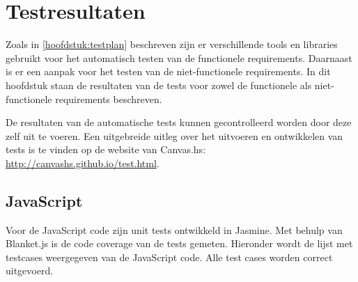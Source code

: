 \section{Testresultaten} \label{sec:testresultaten}
Zoals in \autoref{hoofdstuk:testplan} beschreven zijn er verschillende tools en libraries gebruikt voor het automatisch testen van de functionele requirements. Daarnaast is er een aanpak voor het testen van de niet-functionele requirements. In dit hoofdstuk staan de resultaten van de tests voor zowel de functionele als niet-functionele requirements beschreven.

De resultaten van de automatische tests kunnen gecontrolleerd worden door deze zelf uit te voeren. Een uitgebreide uitleg over het uitvoeren en ontwikkelen van tests is te vinden op de website van Canvas.hs: \url{http://canvashs.github.io/test.html}.

\subsection{JavaScript}
Voor de JavaScript code zijn unit tests ontwikkeld in Jasmine. Met behulp van Blanket.js is de code coverage van de tests gemeten. Hieronder wordt de lijst met testcases weergegeven van de JavaScript code. Alle test cases worden correct uitgevoerd.

